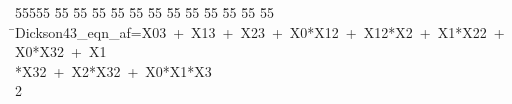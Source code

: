 %
%
\begin{tabbing}
55555 \= 55 \= 55 \= 55 \= 55 \= 55 \= 55 \= 55 \= 55 \= 55 \= 55 \= 55 \= 55 \= \>Dickson43\_eqn\_af=X03\ +\ X13\ +\ X23\ +\ X0*X12\ +\ X12*X2\ +\ X1*X22\ +\ X0*X32\ +\ X1\\[0pt]
\>*X32\ +\ X2*X32\ +\ X0*X1*X3\\[0pt]
2\>\end{tabbing}
